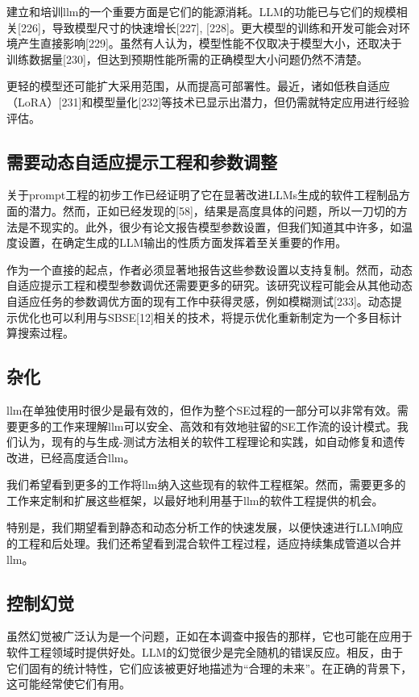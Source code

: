 \begin{translation}
建立和培训llm的一个重要方面是它们的能源消耗。LLM的功能已与它们的规模相关[226]，导致模型尺寸的快速增长[227], [228]。更大模型的训练和开发可能会对环境产生直接影响[229]。虽然有人认为，模型性能不仅取决于模型大小，还取决于训练数据量[230]，但达到预期性能所需的正确模型大小问题仍然不清楚。

更轻的模型还可能扩大采用范围，从而提高可部署性。最近，诸如低秩自适应（LoRA）[231]和模型量化[232]等技术已显示出潜力，但仍需就特定应用进行经验评估。

\subsection{需要动态自适应提示工程和参数调整}

关于prompt工程的初步工作已经证明了它在显著改进LLMs生成的软件工程制品方面的潜力。然而，正如已经发现的[58]，结果是高度具体的问题，所以一刀切的方法是不现实的。此外，很少有论文报告模型参数设置，但我们知道其中许多，如温度设置，在确定生成的LLM输出的性质方面发挥着至关重要的作用。

作为一个直接的起点，作者必须显著地报告这些参数设置以支持复制。然而，动态自适应提示工程和模型参数调优还需要更多的研究。该研究议程可能会从其他动态自适应任务的参数调优方面的现有工作中获得灵感，例如模糊测试[233]。动态提示优化也可以利用与SBSE[12]相关的技术，将提示优化重新制定为一个多目标计算搜索过程。

\subsection{杂化}

llm在单独使用时很少是最有效的，但作为整个SE过程的一部分可以非常有效。需要更多的工作来理解llm可以安全、高效和有效地驻留的SE工作流的设计模式。我们认为，现有的与生成-测试方法相关的软件工程理论和实践，如自动修复和遗传改进，已经高度适合llm。

我们希望看到更多的工作将llm纳入这些现有的软件工程框架。然而，需要更多的工作来定制和扩展这些框架，以最好地利用基于llm的软件工程提供的机会。

特别是，我们期望看到静态和动态分析工作的快速发展，以便快速进行LLM响应的工程和后处理。我们还希望看到混合软件工程过程，适应持续集成管道以合并llm。

\subsection{控制幻觉}

虽然幻觉被广泛认为是一个问题，正如在本调查中报告的那样，它也可能在应用于软件工程领域时提供好处。LLM的幻觉很少是完全随机的错误反应。相反，由于它们固有的统计特性，它们应该被更好地描述为“合理的未来”。在正确的背景下，这可能经常使它们有用。


\end{translation}
